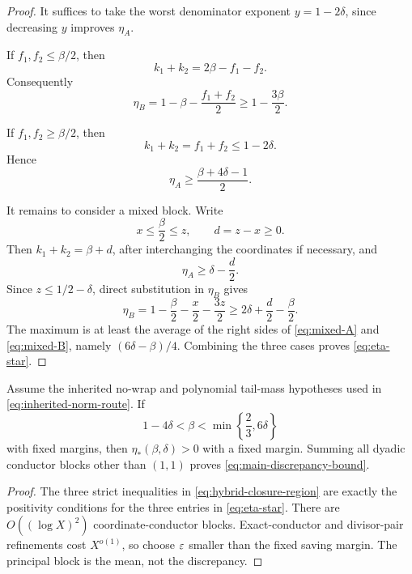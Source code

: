 \begin{proof}
It suffices to take the worst denominator exponent
\(y=1-2\delta\), since decreasing \(y\) improves \(\eta_A\).

If \(f_1,f_2\le\beta/2\), then
\[
 k_1+k_2=2\beta-f_1-f_2.
\]
Consequently
\[
 \eta_B=1-\beta-\frac{f_1+f_2}{2}
 \ge1-\frac{3\beta}{2}.
\]

If \(f_1,f_2\ge\beta/2\), then
\[
 k_1+k_2=f_1+f_2\le1-2\delta.
\]
Hence
\[
 \eta_A\ge\frac{\beta+4\delta-1}{2}.
\]

It remains to consider a mixed block.  Write
\[
 x\le\frac\beta2\le z,\qquad d=z-x\ge0.
\]
Then \(k_1+k_2=\beta+d\), after interchanging the coordinates if
necessary, and
\begin{equation}
 \eta_A\ge\delta-\frac d2.
 \label{eq:mixed-A}
\end{equation}
Since \(z\le1/2-\delta\), direct substitution in \(\eta_B\) gives
\begin{equation}
 \eta_B
 =1-\frac\beta2-\frac x2-\frac{3z}{2}
 \ge2\delta+\frac d2-\frac\beta2.
 \label{eq:mixed-B}
\end{equation}
The maximum is at least the average of the right sides of
\eqref{eq:mixed-A} and \eqref{eq:mixed-B}, namely
\((6\delta-\beta)/4\).  Combining the three cases proves
\eqref{eq:eta-star}.
\end{proof}

\begin{corollary}
\label{cor:hybrid-closure-region}
Assume the inherited no-wrap and polynomial tail-mass hypotheses used
in \eqref{eq:inherited-norm-route}.  If
\begin{equation}
 1-4\delta<\beta<\min\left\{\frac23,6\delta\right\}
 \label{eq:hybrid-closure-region}
\end{equation}
with fixed margins, then \(\eta_*(\beta,\delta)>0\) with a fixed
margin.  Summing all dyadic conductor blocks other than \((1,1)\)
proves \eqref{eq:main-discrepancy-bound}.
\end{corollary}

\begin{proof}
The three strict inequalities in
\eqref{eq:hybrid-closure-region} are exactly the positivity conditions
for the three entries in \eqref{eq:eta-star}.  There are
\(O((\log X)^2)\) coordinate-conductor blocks.  Exact-conductor and
divisor-pair refinements cost \(X^{o(1)}\), so choose \(\varepsilon\) smaller
than the fixed saving margin.  The principal block is the mean, not the
discrepancy.
\end{proof}

